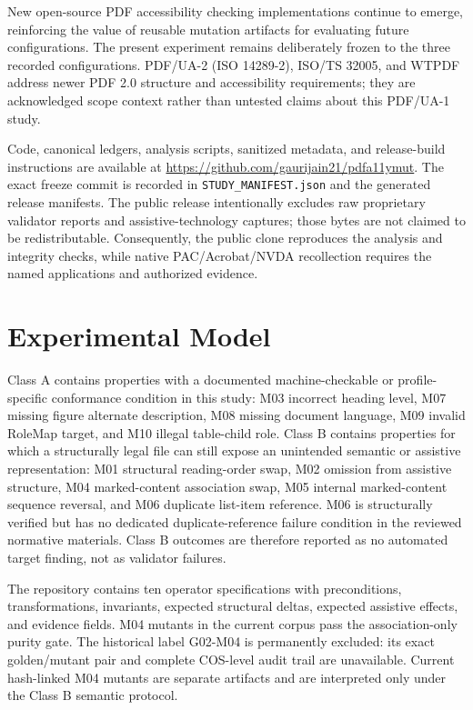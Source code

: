 \documentclass[conference]{IEEEtran}
\newcommand{\taggedsection}[1]{%
  \tagstructbegin{tag=H1}\tagmcbegin{tag=H1}\section{#1}\tagmcend\tagstructend}
\newenvironment{taggedparagraph}{%
  \tagstructbegin{tag=P}\tagmcbegin{tag=P}%
}{%
  \tagmcend\tagstructend%
}
\begin{document}
\begin{taggedparagraph}
New open-source PDF accessibility checking implementations continue to emerge, reinforcing the value of reusable mutation artifacts for evaluating future configurations. The present experiment remains deliberately frozen to the three recorded configurations. PDF/UA-2 (ISO 14289-2), ISO/TS 32005, and WTPDF address newer PDF 2.0 structure and accessibility requirements; they are acknowledged scope context rather than untested claims about this PDF/UA-1 study.
\end{taggedparagraph}

\begin{taggedparagraph}
Code, canonical ledgers, analysis scripts, sanitized metadata, and release-build instructions are available at
\url{https://github.com/gaurijain21/pdfa11ymut}. The exact freeze commit is recorded in
\texttt{STUDY\_MANIFEST.json} and the generated release manifests. The public release intentionally excludes
raw proprietary validator reports and assistive-technology captures; those bytes are not claimed to be
redistributable. Consequently, the public clone reproduces the analysis and integrity checks, while native
PAC/Acrobat/NVDA recollection requires the named applications and authorized evidence.
\end{taggedparagraph}

\taggedsection{Experimental Model}
\begin{taggedparagraph}
Class A contains properties with a documented machine-checkable or profile-specific conformance condition in this study: M03 incorrect heading level, M07 missing figure alternate description, M08 missing document language, M09 invalid RoleMap target, and M10 illegal table-child role. Class B contains properties for which a structurally legal file can still expose an unintended semantic or assistive representation: M01 structural reading-order swap, M02 omission from assistive structure, M04 marked-content association swap, M05 internal marked-content sequence reversal, and M06 duplicate list-item reference. M06 is structurally verified but has no dedicated duplicate-reference failure condition in the reviewed normative materials. Class B outcomes are therefore reported as no automated target finding, not as validator failures.
\end{taggedparagraph}



\begin{taggedparagraph}
The repository contains ten operator specifications with preconditions, transformations, invariants, expected structural deltas, expected assistive effects, and evidence fields. M04 mutants in the current corpus pass the association-only purity gate. The historical label G02-M04 is permanently excluded: its exact golden/mutant pair and complete COS-level audit trail are unavailable. Current hash-linked M04 mutants are separate artifacts and are interpreted only under the Class B semantic protocol.
\end{taggedparagraph}
\end{document}
